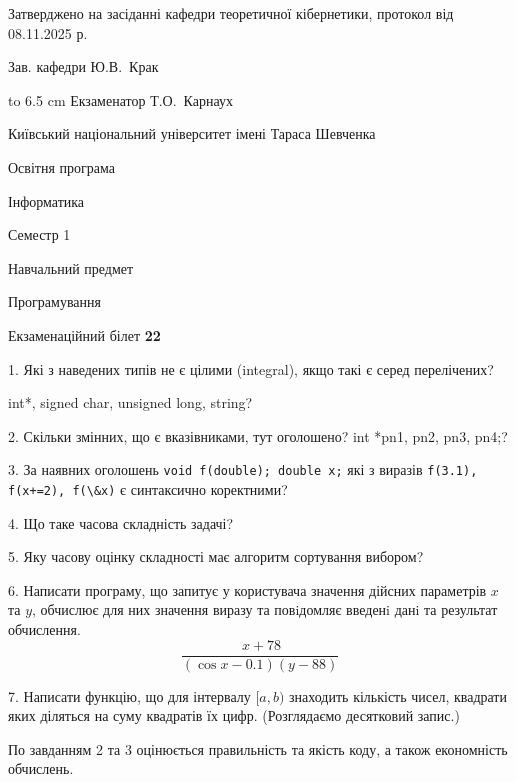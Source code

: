 \documentclass[12pt, ukrainian]{article}
\def\code#1{\Verb!#1!}
\begin{document}
{\smallskip\smallskip \begin {scriptsize} Затверджено на засіданні кафедри теоретичної кібернетики, протокол   від   08.11.2025 р.\par\smallskip\smallskip\smallskip\smallskip
{\parbox {6.5 cm} {Зав. кафедри \dotfill Ю.В.~Крак}}\hspace {0.7cm} {\hbox to 6.5 cm { Екзаменатор \dotfill Т.О.~Карнаух}} \end{scriptsize}}
\vspace{0.9cm}
{{\begin {scriptsize}\par
{ \center  Київський національний університет імені Тараса Шевченка \par}
{\parbox {5 cm}{Освітня програма \hfill}{\parbox {7 cm}{Інформатика\hfill}}\parbox {6 cm}{\hfill Семестр 1}}\par
{\parbox {5 cm} {Навчальний предмет \hfill}\parbox {7 cm}{Програмування \hfill}\parbox {6cm}{\hfill}\par}\vspace{-15pt} \end{scriptsize}}{\center Екзаменаційний білет \No \textbf { 22 }\par}}
{%
1. Які з наведених типів не є цілими (integral), якщо такі є серед перелічених?

int*, signed char, unsigned long, string?
\par
\vspace{2mm}
2. Скільки змінних, що є вказівниками, тут оголошено?
int *pn1, pn2, pn3, pn4;?
\par
\vspace{2mm}
3. За наявних оголошень \code{void f(double); double x;} які з виразів \code{f(3.1), f(x+=2), f(\&x)} є синтаксично коректними?
\par
\vspace{2mm}
4. Що таке часова складність задачі?
\par
\vspace{2mm}
5. Яку часову оцінку складності має алгоритм сортування вибором?
\par
\vspace{2mm}
6. Написати програму, що запитує у користувача значення дійсних параметрів $x$ та $y$, обчислює для них значення виразу та повiдомляє введенi данi та результат обчислення.
$$\frac{\ x + 78}{(\cos x - 0.1) (y - 88)}$$ 

\par
7. Написати функцію, що для інтервалу $[a, b)$ знаходить кількість чисел, квадрати яких діляться на суму квадратів їх цифр. (Розглядаємо десятковий запис.)

По завданням 2 та 3 оцінюється правильність та якість коду, а також економність обчислень.

}
\end{document}
